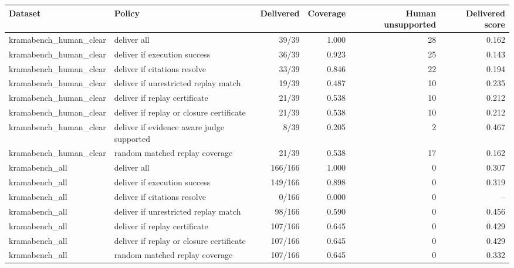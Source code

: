 \begin{tabular}{llrrrr}
\toprule
Dataset & Policy & Delivered & Coverage & Human unsupported & Delivered score \\
\midrule
kramabench_human_clear & deliver all & 39/39 & 1.000 & 28 & 0.162 \\
kramabench_human_clear & deliver if execution success & 36/39 & 0.923 & 25 & 0.143 \\
kramabench_human_clear & deliver if citations resolve & 33/39 & 0.846 & 22 & 0.194 \\
kramabench_human_clear & deliver if unrestricted replay match & 19/39 & 0.487 & 10 & 0.235 \\
kramabench_human_clear & deliver if replay certificate & 21/39 & 0.538 & 10 & 0.212 \\
kramabench_human_clear & deliver if replay or closure certificate & 21/39 & 0.538 & 10 & 0.212 \\
kramabench_human_clear & deliver if evidence aware judge supported & 8/39 & 0.205 & 2 & 0.467 \\
kramabench_human_clear & random matched replay coverage & 21/39 & 0.538 & 17 & 0.162 \\
kramabench_all & deliver all & 166/166 & 1.000 & 0 & 0.307 \\
kramabench_all & deliver if execution success & 149/166 & 0.898 & 0 & 0.319 \\
kramabench_all & deliver if citations resolve & 0/166 & 0.000 & 0 & -- \\
kramabench_all & deliver if unrestricted replay match & 98/166 & 0.590 & 0 & 0.456 \\
kramabench_all & deliver if replay certificate & 107/166 & 0.645 & 0 & 0.429 \\
kramabench_all & deliver if replay or closure certificate & 107/166 & 0.645 & 0 & 0.429 \\
kramabench_all & random matched replay coverage & 107/166 & 0.645 & 0 & 0.332 \\
\bottomrule
\end{tabular}
